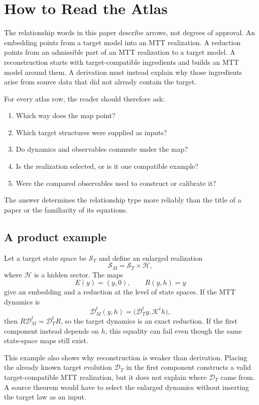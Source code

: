 \documentclass[11pt]{article}
\begin{document}
\tableofcontents

\section{How to Read the Atlas}

The relationship words in this paper describe arrows, not degrees of approval.
An embedding points from a target model into an MTT realization.  A reduction
points from an admissible part of an MTT realization to a target model.  A
reconstruction starts with target-compatible ingredients and builds an MTT
model around them.  A derivation must instead explain why those ingredients
arise from source data that did not already contain the target.

For every atlas row, the reader should therefore ask:
\begin{enumerate}
\item Which way does the map point?
\item Which target structures were supplied as inputs?
\item Do dynamics and observables commute under the map?
\item Is the realization selected, or is it one compatible example?
\item Were the compared observables used to construct or calibrate it?
\end{enumerate}
The answer determines the relationship type more reliably than the title of a
paper or the familiarity of its equations.

\subsection{A product example}

Let a target state space be $\mathcal S_T$ and define an enlarged realization
\[
 \mathcal S_M=\mathcal S_T\times\mathcal H,
\]
where $\mathcal H$ is a hidden sector.  The maps
\[
 E(y)=(y,0),
 \qquad
 R(y,h)=y
\]
give an embedding and a reduction at the level of state spaces.  If the MTT
dynamics is
\[
 \mathcal D_M^t(y,h)
 =
 \bigl(\mathcal D_T^t y,\mathcal K^t h\bigr),
\]
then $R\mathcal D_M^t=\mathcal D_T^tR$, so the target dynamics is an exact
reduction.  If the first component instead depends on $h$, this equality can
fail even though the same state-space maps still exist.

This example also shows why reconstruction is weaker than derivation.  Placing
the already known target evolution $\mathcal D_T$ in the first component
constructs a valid target-compatible MTT realization, but it does not explain
where $\mathcal D_T$ came from.  A source theorem would have to select the
enlarged dynamics without inserting the target law as an input.
\end{document}
